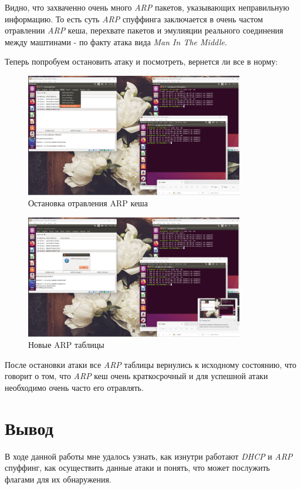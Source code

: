 \documentclass[a4paper]{article}
\begin{document}
  Видно, что захваченно очень много \textit{ARP} пакетов, указывающих неправильную информацию. То
  есть суть \textit{ARP} спуффинга заключается в очень частом отравлении \textit{ARP} кеша, перехвате пакетов
  и эмулияции реального соединения между маштинами - по факту атака вида \textit{Man In The Middle}.

  Теперь попробуем остановить атаку и посмотреть, вернется ли все в норму:
  
  \begin{figure}[H]
    \centering
    \includegraphics[width=0.85\textwidth]{02_00 (60)}
    \caption{Остановка отравления ARP кеша}
    \label{img:0046}
  \end{figure}
  
  \begin{figure}[H]
    \centering
    \includegraphics[width=0.85\textwidth]{02_00 (61)}
    \caption{Новые ARP таблицы}
    \label{img:0047}
  \end{figure}

  После остановки атаки все \textit{ARP} таблицы вернулись к исходному состоянию,
  что говорит о том, что \textit{ARP} кеш очень краткосрочный и для успешной атаки
  необходимо очень часто его отравлять.

  \section{Вывод}

  В ходе данной работы мне удалось узнать, как изнутри работают \textit{DHCP} и \textit{ARP} спуффинг,
  как осуществить данные атаки и понять, что может послужить флагами для их обнаружения.
\end{document}
